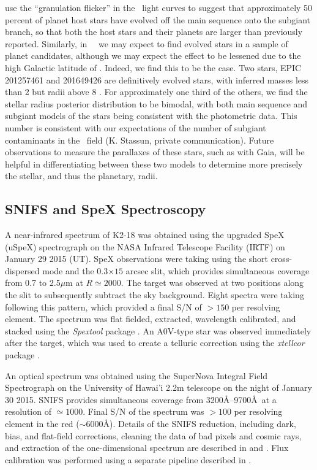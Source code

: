 \citet{Bastien14} use the ``granulation flicker'' in the \kep\ light curves
to suggest that
approximately 50 percent of planet host stars have evolved off the
main sequence onto the subgiant branch, so that both the host stars and their
planets are larger than previously reported.
Similarly, in \KT\ \Ci\ we may expect to find evolved stars in a sample of planet
candidates, although we may expect the effect to be lessened due to the
high Galactic latitude of \Ci.
Indeed, we find this to be the case.
Two stars, EPIC 201257461 and 201649426 are definitively evolved stars,
with inferred masses less than 2 \msun but radii above 8 \rsun.
For approximately one third of the others,
we find the stellar radius posterior distribution to be bimodal, with both main
sequence and subgiant models of the stars being consistent with the photometric
data.
This number is consistent with our expectations of the number of subgiant
contaminants in the \Ci\ field (K. Stassun, private communication).
Future observations to measure the parallaxes of these stars, such as with Gaia,
will be helpful in differentiating between these two models to determine
more precisely the stellar, and thus the planetary, radii.






\subsection{SNIFS and SpeX Spectroscopy}
\label{Spexobs}


A near-infrared spectrum of K2-18 was obtained using the upgraded SpeX
(uSpeX) spectrograph \citep{Rayner03} on the NASA Infrared Telescope Facility
(IRTF) on January 29 2015 (UT).
SpeX observations were taking using the short cross-dispersed mode and the
0.3$\times15$ arcsec slit, which provides simultaneous coverage from 0.7
to 2.5$\mu$m at $R\simeq2000$.
The target was observed at two positions along the slit to subsequently subtract
the sky background. Eight spectra were taking following this pattern, which provided
a final S/N of $>150$ per resolving element.
The spectrum was flat fielded, extracted, wavelength calibrated, and stacked
using the \textit{Spextool} package \citep{Cushing04}.
An A0V-type star was observed immediately after
the target, which was used to create a telluric correction using the
\textit{xtellcor} package \citep{Vacca03}.

An optical spectrum was obtained using the SuperNova Integral Field Spectrograph
\citep[SNIFS,][]{Aldering02,Lantz04} on the University of Hawai'i
2.2m telescope on the night of January 30 2015.
SNIFS provides simultaneous coverage from 3200\AA--9700\AA\ at a resolution
of $\simeq1000$. Final S/N of the spectrum was $>100$ per resolving element
in the red ($\sim6000$\AA).
Details of the SNIFS reduction, including dark, bias, and flat-field corrections,
cleaning the data of bad pixels and cosmic rays, and extraction of the
one-dimensional spectrum are described in \citet{Bacon01} and
\citet{Aldering06}.
Flux calibration was performed using a separate pipeline described in \citet{Mann15}.

